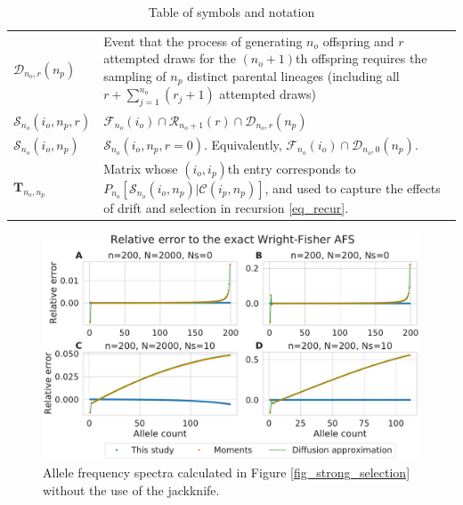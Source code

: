 \documentclass[9pt,twocolumn,twoside,lineno]{gsajnl}
\newcommand{\ms}{\mathcal{S}}
\begin{document}
\begin{table}
\begin{tabular}{l|p{}}
      $\mathcal{D}_{n_o, r}(n_p)$ & Event that the process of generating $n_o$ offspring and $r$ attempted draws for the $(n_o+1)$th offspring requires the sampling of $n_p$ distinct parental lineages (including all $r + \sum_{j=1}^{n_o} (r_j+1)$ attempted draws)\\   
  $\ms_{n_o}(i_o, n_p, r)$ &  $\mathcal{F}_{n_o}(i_o) \cap \mathcal{R}_{n_o+1}(r) \cap \mathcal{D}_{n_o, r}(n_p)$ 
\\
    $\mathcal{S}_{n_o}(i_o, n_p)$ &  $\ms_{n_o}(i_o, n_p, r=0)$. Equivalently, $\mathcal{F}_{n_o}(i_o) \cap \mathcal{D}_{n_o, 0}(n_p).$ %
      

    \\
    $\mathbf{T}_{n_o,n_p}$ & Matrix whose $(i_o,i_p)$th entry corresponds to $P_{n_o}\left[\ms_{n_o}(i_o, n_p) | \mathcal{C}(i_p, n_p)\right]$, and used to capture the effects of drift and selection in recursion \eqref{eq_recur}. 
  \end{tabular}
  \caption{\label{tab_symbols} Table of symbols and notation}
\end{table}


\begin{figure}
  \centering
  \includegraphics[width=\columnwidth]{fig/afs_comp_small_no_jackknife.pdf}

    \caption{Allele frequency spectra calculated in Figure \ref{fig_strong_selection} without the use of the jackknife.    }

  \label{fig_apx_no_jackknife}
\end{figure}
\end{document}
